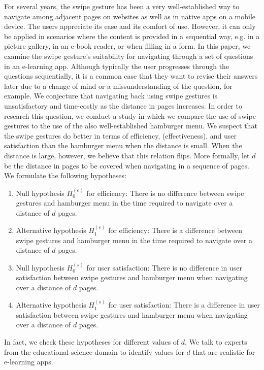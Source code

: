 \documentclass{sig-alternate-05-2015}
\begin{document}
For several years, the swipe gesture has been a very well-established way to navigate among adjacent pages on websites as well as in native
apps on a mobile device. The users appreciate its ease and its comfort of use. However, it can only be applied in scenarios where
the content is provided in a sequential way, e.g. in a picture gallery, in an e-book reader, or when filling in a form. In this paper, we
examine the swipe gesture's suitability for navigating through a set of questions in an e-learning app. Although typically the user progresses 
through the questions sequentially, it is a common case that they want to revise their answers later due to a change of mind or a missunderstanding
of the question, for example. We conjecture that navigating back using swipe gestures is unsatisfactory and time-costly as the distance in pages
increases. In order to research this question, we conduct a study in which we compare the use of swipe gestures to the use of the also
well-established hamburger menu. We suspect that the swipe gestures do better in terms of efficiency, (effectiveness), and
user satisfaction than the hamburger menu when the distance is small. When the distance is large, however,
we believe that this relation flips. More formally, let $d$ be the distance in pages to be covered when navigating in a sequence of pages.
We formulate the following hypotheses:
\begin{enumerate}
  \item Null hypothesis $H_0^{(e)}$ for efficiency: There is no difference between swipe gestures and hamburger menu in the time required to navigate over a distance of $d$ pages.
  \item Alternative hypothesis $H_1^{(e)}$ for efficiency: There is a difference between swipe gestures and hamburger menu in the time required to navigate over a distance of $d$ pages.
  \item Null hypothesis $H_0^{(s)}$ for user satisfaction: There is no difference in user satisfaction between swipe gestures and hamburger menu when navigating over a distance of $d$ pages.
  \item Alternative hypothesis $H_1^{(s)}$ for user satisfaction: There is a difference in user satisfaction between swipe gestures and hamburger menu when navigating over a distance of $d$ pages.
\end{enumerate}
In fact, we check these hypotheses for different values of $d$. We talk to experts from the educational science domain to identify values for $d$ that are realistic for e-learning apps.
\end{document}
